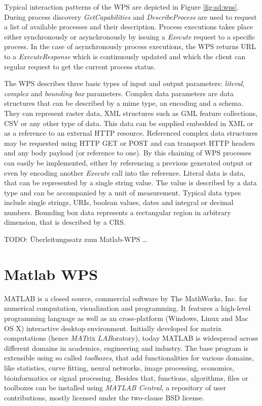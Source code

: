 	Typical interaction patterns of the \acl{WPS} are depicted in Figure \ref{fig:sd:wps}. During process discovery \emph{GetCapabilities} and \emph{DescribeProcess} are used to request a list of available processes and their description. Process executions takes place either synchronously or asynchronously by issuing a \emph{Execute} request to a specific process. In the case of asynchronously process executions, the \ac{WPS} returns URL to a \emph{ExecuteResponse} which is continuously updated and which the client can regular request to get the current process status.

	The \ac{WPS} describes three basic types of input and output parameters: \emph{literal}, \emph{complex} and \emph{bounding box} parameters. Complex data parameters are data structures that can be described by a mime type, an encoding and a schema. They can represent raster data, XML structures such as GML feature collections, CSV or any other type of data. This data can be supplied embedded in XML or as a reference to an external HTTP resource. Referenced complex data structures may be requested using HTTP GET or POST and can transport HTTP headers and any body payload (or reference to one). By this chaining of \ac{WPS} processes can easily be implemented, either by referencing a previous generated output or even by encoding another \emph{Execute} call into the reference. Literal data is data, that can be represented by a single string value. The value is described by a data type and can be accompanied by a unit of measurement. Typical data types include single strings, URIs, boolean values, dates and integral or decimal numbers. Bounding box data represents a rectangular region in arbitrary dimension, that is described by a \ac{CRS}.

	TODO: Überleitungssatz zum Matlab-WPS \dots
\chapter{Matlab WPS}
	MATLAB is a closed source, commercial software by The MathWorks, Inc. for numerical computation, visualization and programming. It features a high-level programming language as well as an cross-platform (Windows, Linux and Mac OS X) interactive desktop environment. Initially developed for matrix computations (hence \emph{MAT}rix \emph{LAB}oratory), today MATLAB is widespread across different domains in academics, engineering and industry. The base program is extensible using so called \emph{toolboxes}, that add functionalities for various domains, like statistics, curve fitting, neural networks, image processing, economics, bioinformatics or signal processing. Besides that, functions, algorithms, files or toolboxes can be installed using \emph{MATLAB Central}, a repository of user contributions, mostly licensed under the two-clause BSD license.

